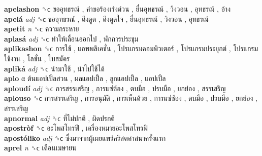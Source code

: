 \textbf{apelashon} ␝ϲ   ขออุทธรณ์ ,  คำขอร้องเร่งด่วน ,  ยื่นอุทธรณ์ ,  วิงวอน ,  อุทธรณ์ ,  อ้าง   \\
\textbf{apelá} \emph{adj}  ␝ϲ   ขออุทธรณ์ ,  ดึงดูด ,  ดึงดูดใจ ,  ยื่นอุทธรณ์ ,  วิงวอน ,  อุทธรณ์   \\
\textbf{apetit} \emph{n}  ␝ϲ   ความกระหาย   \\
\textbf{aplasá} \emph{adj}  ␝ϲ   ทำให้เลื่อนออกไป ,  พักการประชุม   \\
\textbf{aplikashon} ␝ϲ   การใช้ ,  แอพพลิเคชั่น ,  โปรแกรมคอมพิวเตอร์ ,  โปรแกรมประยุกต์ ,  โปรแกรมใช้งาน ,  โลชั่น ,  ใบสมัคร   \\
\textbf{apliká} \emph{adj}  ␝ϲ   นำมาใช้ ,  นำไปใช้ได้   \\
\textbf{aplo} α   ต้นแอปเปิ้ลสวน ,  ผลแอปเปิ้ล ,  ลูกแอปเปิ้ล ,  แอปเปิ้ล   \\
\textbf{aploudí} \emph{adj}  ␝ϲ   การสรรเสริญ ,  การแซ่ซ้อง ,  ตบมือ ,  ปรบมือ ,  ยกย่อง ,  สรรเสริญ   \\
\textbf{aplouso} ␝ϲ   การสรรเสริญ ,  การอนุมัติ ,  การเห็นด้วย ,  การแซ่ซ้อง ,  ตบมือ ,  ปรบมือ ,  ยกย่อง ,  สรรเสริญ   \\
\textbf{apnormal} \emph{adj}  ␝ϲ   ที่ไม่ปกติ ,  ผิดปรกติ   \\
\textbf{apostròf} ␝ϲ   อะโพสโทรฟี ,  เครื่องหมายอะโพสโทรฟี   \\
\textbf{apostóliko} \emph{adj}  ␝ϲ   ซึ่งมาจากผู้เผยแพร่คริสตศาสนาครั้งแรก   \\
\textbf{aprel} \emph{n}  ␝ϲ   เดือนเมษายน   \\
